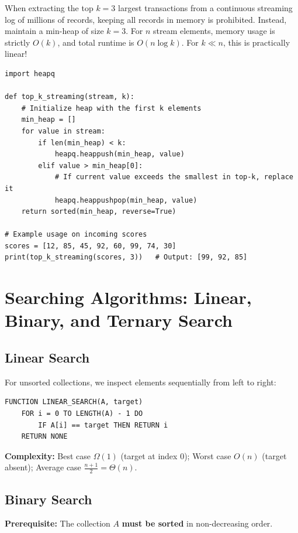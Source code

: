 \documentclass[11pt,a4paper]{article}
\begin{document}
\begin{examplebox}
When extracting the top $k = 3$ largest transactions from a continuous streaming log of millions of records, keeping all records in memory is prohibited. Instead, maintain a min-heap of size $k=3$. For $n$ stream elements, memory usage is strictly $O(k)$, and total runtime is $O(n \log k)$. For $k \ll n$, this is practically linear!
\end{examplebox}

\begin{lstlisting}[style=pythonstyle]
import heapq

def top_k_streaming(stream, k):
    # Initialize heap with the first k elements
    min_heap = []
    for value in stream:
        if len(min_heap) < k:
            heapq.heappush(min_heap, value)
        elif value > min_heap[0]:
            # If current value exceeds the smallest in top-k, replace it
            heapq.heappushpop(min_heap, value)
    return sorted(min_heap, reverse=True)

# Example usage on incoming scores
scores = [12, 85, 45, 92, 60, 99, 74, 30]
print(top_k_streaming(scores, 3))   # Output: [99, 92, 85]
\end{lstlisting}

\newpage
\section{Searching Algorithms: Linear, Binary, and Ternary Search}

\subsection{Linear Search}
For unsorted collections, we inspect elements sequentially from left to right:
\begin{lstlisting}[style=pseudostyle]
FUNCTION LINEAR_SEARCH(A, target)
    FOR i = 0 TO LENGTH(A) - 1 DO
        IF A[i] == target THEN RETURN i
    RETURN NONE
\end{lstlisting}
\textbf{Complexity:} Best case $\Omega(1)$ (target at index 0); Worst case $O(n)$ (target absent); Average case $\frac{n+1}{2} = \Theta(n)$.

\subsection{Binary Search}
\textbf{Prerequisite:} The collection $A$ \textbf{must be sorted} in non-decreasing order.
\end{document}
